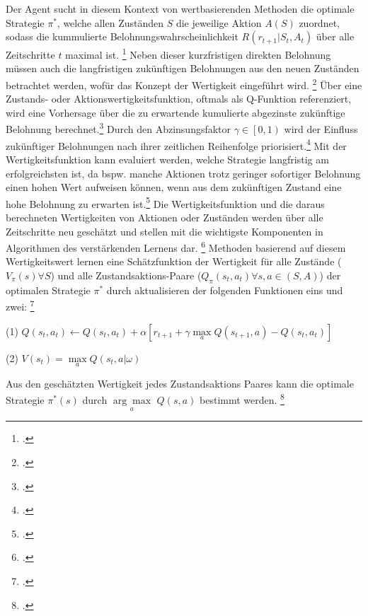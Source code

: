 Der Agent sucht in diesem Kontext von wertbasierenden Methoden die optimale Strategie $\pi^{*}$, welche allen Zuständen $S$ die jeweilige Aktion $A(S)$ zuordnet, sodass die kummulierte Belohnungswahrscheinlichkeit $R(r_{t+1}|S_{t},A_{t})$ über alle Zeitschritte $t$ maximal ist. \footcite[Vgl.][S. 2]{Reda.2020}
Neben dieser kurzfristigen direkten Belohnung müssen auch die langfristigen zukünftigen Belohnungen aus den neuen Zuständen betrachtet werden, wofür das Konzept der Wertigkeit eingeführt wird. \footcite[Vgl.][S. 3]{Wang.2020}
Über eine Zustands- oder Aktionswertigkeitsfunktion, oftmals als Q-Funktion referenziert, wird eine Vorhersage über die zu erwartende kumulierte abgezinste zukünftige Belohnung berechnet.\footcite[Vgl.][S. 5]{Li.2019}
Durch den Abzinsungsfaktor $\gamma \in \left[0,1\right)$ wird der Einfluss zukünftiger Belohnungen nach ihrer zeitlichen Reihenfolge priorisiert.\footcite[Vgl][S. 5]{Li.2019}
Mit der Wertigkeitsfunktion kann evaluiert werden, welche Strategie langfristig am erfolgreichsten ist, da bspw. manche Aktionen trotz geringer sofortiger Belohnung einen hohen Wert aufweisen können, wenn aus dem zukünftigen Zustand eine hohe Belohnung zu erwarten ist.\footcite[Vgl.][S. 6]{Sutton.2018}
Die Wertigkeitsfunktion und die daraus berechneten Wertigkeiten von Aktionen oder Zuständen werden über alle Zeitschritte neu geschätzt und stellen mit die wichtigste Komponenten in Algorithmen des verstärkenden Lernens dar. \footcite[Vgl.][S. 6f.]{Sutton.2018}
Methoden basierend auf diesem Wertigkeitswert lernen eine Schätzfunktion der Wertigkeit für alle Zustände ($V_{\pi}(s) \forall S$) und alle Zustandsaktions-Paare ($Q_{\pi}(s_{t},a_{t}) \forall s,a \in (S,A)$) der optimalen Strategie $\pi^{*}$ durch aktualisieren der folgenden Funktionen eins und zwei: \footcite[Vgl.][S. 2]{Zhang.2018}
\begin{description}
    \item \begin{center} (1) $Q(s_{t}, a_{t}) \leftarrow Q(s_{t}, a_{t}) + \alpha\left[r_{t+1} + \gamma\max\limits_{a}Q(s_{t+1},a)-Q(s_{t},a_{t})\right]$ \end{center}
    \item \begin{center} (2) $V(s_{t}) = \max\limits_{a}Q(s_{t},a|\omega)$ \end{center}
\end{description}
Aus den geschätzten Wertigkeit jedes Zustandsaktions Paares kann die optimale Strategie $\pi^{*}(s)$ durch $\underset{a}{\arg\max}$ $Q(s,a)$ bestimmt werden. \footcite[Vgl.][S. 2]{Zhang.2018}

